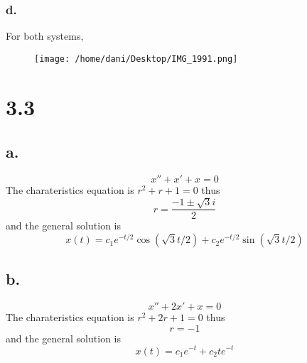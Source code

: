 \documentclass[11pt]{article}
\theoremstyle{mystyle}
\theoremstyle{definition}
\begin{document}
\subsubsection*{d.}
For both systems, 
\begin{figure}[h]
  \centering
  \texttt{[image: /home/dani/Desktop/IMG\_1991.png]}
  \caption{}
  \label{fig:img_1991}
\end{figure}
\clearpage
\section*{3.3}
\subsection*{a.}
\[
  x'' + x' + x = 0 
\]
The charateristics equation is $r^2 + r + 1 = 0$ thus 
\[
  r = \displaystyle\frac{-1 \pm \sqrt{3}i}{2}
\]
and the general solution is 
\[
  x(t) = c_1 e^{-t/2}\cos(\sqrt{3}t/2) + c_2 e^{-t/2} \sin(\sqrt{3}t/2)
\]
\subsection*{b.}
\[
  x'' + 2x' + x = 0 
\]
The charateristics equation is $r^2 + 2r + 1 = 0$ thus 
\[
  r = -1
\]
and the general solution is 
\[
  x(t) = c_1 e^{-t} + c_2 te^{-t}
\]
\clearpage
\end{document}
